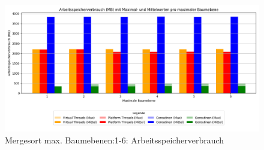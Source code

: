 \documentclass[fontsize=12pt,paper=a4,twoside=semi,parskip=half-,headsepline,headinclude]{scrreprt}
\begin{document}
\begin{figure}[H]
	\centering
	\includegraphics[scale=0.5]{figures/mergesort/Maximalebauebenen1-6/memory_usage_bar_plot.png}
	\caption{Mergesort max. Baumebenen:1-6: Arbeitsspeicherverbrauch}
	\label{fig:ms1-6RAM}
\end{figure}
\end{document}
